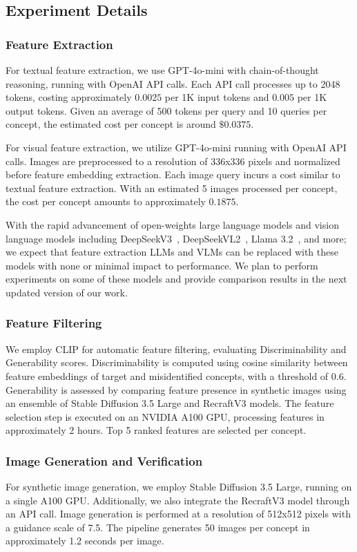 \subsection{Experiment Details}

\subsubsection{Feature Extraction}
For textual feature extraction, we use GPT-4o-mini with chain-of-thought reasoning, running with OpenAI API calls. Each API call processes up to 2048 tokens, costing approximately $0.0025$ per 1K input tokens and $0.005$ per 1K output tokens. Given an average of 500 tokens per query and 10 queries per concept, the estimated cost per concept is around $\$0.0375$.

For visual feature extraction, we utilize GPT-4o-mini running with OpenAI API calls. Images are preprocessed to a resolution of 336x336 pixels and normalized before feature embedding extraction. Each image query incurs a cost similar to textual feature extraction. With an estimated 5 images processed per concept, the cost per concept amounts to approximately $0.1875$. 

With the rapid advancement of open-weights large language models and vision language models including DeepSeekV3~\cite{liu2024deepseek}, DeepSeekVL2~\cite{wu2024deepseekvl2}, Llama 3.2~\cite{dubey2024llama}, and more; we expect that feature extraction LLMs and VLMs can be replaced with these models with none or minimal impact to performance. We plan to perform experiments on some of these models and provide comparison results in the next updated version of our work.

\subsubsection{Feature Filtering}
We employ CLIP for automatic feature filtering, evaluating Discriminability and Generability scores. Discriminability is computed using cosine similarity between feature embeddings of target and misidentified concepts, with a threshold of 0.6. Generability is assessed by comparing feature presence in synthetic images using an ensemble of Stable Diffusion 3.5 Large and RecraftV3 models. The feature selection step is executed on an NVIDIA A100 GPU, processing features in approximately 2 hours. Top 5 ranked features are selected per concept.

\subsubsection{Image Generation and Verification}
For synthetic image generation, we employ Stable Diffusion 3.5 Large, running on a single A100 GPU. Additionally, we also integrate the RecraftV3 model through an API call. Image generation is performed at a resolution of 512x512 pixels with a guidance scale of 7.5. The pipeline generates 50 images per concept in approximately 1.2 seconds per image.

